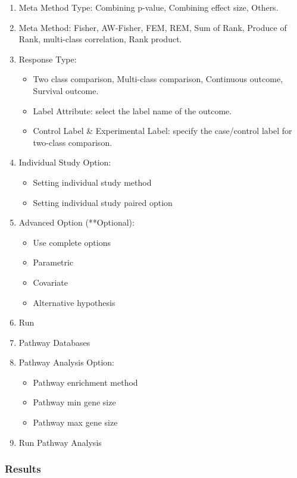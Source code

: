 \begin{enumerate}
  \item Meta Method Type: Combining p-value, Combining effect size, Others.
  \item Meta Method: Fisher, AW-Fisher, FEM, REM, Sum of Rank, Produce of Rank, multi-class correlation, Rank product. 
  \item Response Type:
   \begin{itemize}
     \item Two class comparison, Multi-class comparison, Continuous outcome, Survival outcome.
     \item Label Attribute: select the label name of the outcome.
     \item Control Label \& Experimental Label: specify the case/control label for two-class comparison.
    \end{itemize}
   \item Individual Study Option:
     \begin{itemize}
     \item Setting individual study method
     \item Setting individual study paired option
    \end{itemize} 
   \item Advanced Option (**Optional):
     \begin{itemize}
      \item Use complete options
      \item Parametric
      \item Covariate
      \item Alternative hypothesis
    \end{itemize} 
    \item Run
    \item Pathway Databases
    \item Pathway Analysis Option:
         \begin{itemize}
      \item Pathway enrichment method
      \item Pathway min gene size
      \item Pathway max gene size
    \end{itemize} 
    \item Run Pathway Analysis
\end{enumerate}


\subsubsection{Results}

